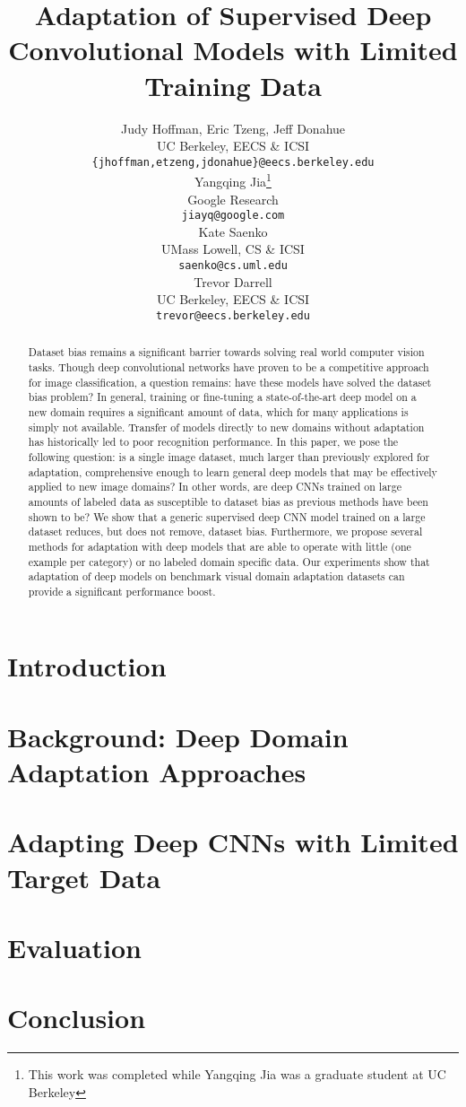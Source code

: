 \documentclass{article} %
\title{Adaptation of Supervised Deep Convolutional Models with Limited Training Data}
\author{
Judy Hoffman, Eric Tzeng, Jeff Donahue \\
UC Berkeley, EECS \& ICSI\\
\footnotesize{\texttt{\{jhoffman,etzeng,jdonahue\}@eecs.berkeley.edu} }\\
\And
Yangqing Jia\thanks{This work was completed while Yangqing Jia was a graduate student at UC Berkeley} \\
Google Research \\
\texttt{jiayq@google.com} \\
\AND
Kate Saenko \\
UMass Lowell, CS \& ICSI \\
\footnotesize{\texttt{saenko@cs.uml.edu}} \\
\And
Trevor Darrell \\
UC Berkeley, EECS \& ICSI\\
\footnotesize{\texttt{trevor@eecs.berkeley.edu}} \\
}
\begin{document}
\maketitle

\begin{abstract}
Dataset bias remains a significant barrier towards solving real world computer vision tasks.
Though deep convolutional networks have proven to be a competitive approach for image classification, a question remains: have these models have solved the dataset bias problem?
In general, training or fine-tuning a state-of-the-art deep model on a new domain requires a significant amount of data, which for many applications is simply not available.
Transfer of models directly to new domains without adaptation has historically led to poor recognition performance.
In this paper, we pose the following question: is a single image dataset, much larger than previously explored for adaptation, comprehensive enough to learn general deep models that may be effectively applied to new image domains? In other words, are deep CNNs trained on large amounts of labeled data as susceptible to dataset bias as previous methods have been shown to be?
We show that a generic supervised deep CNN model trained on a large dataset reduces, but does not remove, dataset bias.
Furthermore, we propose several methods for adaptation with deep models that are able to operate with little (one example per category) or no labeled domain specific data.
Our experiments show that adaptation of deep models on benchmark visual domain adaptation datasets can provide a significant performance boost.

\end{abstract}

\section{Introduction}


\vspace{-.3cm}
\section{Background: Deep Domain Adaptation Approaches}
\vspace{-.2cm}


\vspace{-.3cm}
\section{Adapting Deep CNNs with Limited Target Data}
\label{sec:adapt-algs}
\vspace{-.2cm}


\section{Evaluation}


\section{Conclusion}



\small{


}
\end{document}
